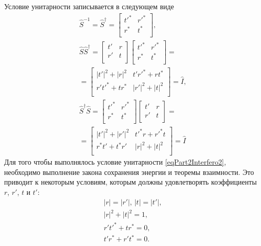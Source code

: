 Условие унитарности записывается в следующем виде
\begin{eqnarray}
\hat{S}^{-1} = 
\hat{S}^{\dag} =
\begin{bmatrix}
t'^\ast & r'^\ast \\
r^\ast & t^\ast \\
\end{bmatrix}, 
\nonumber \\
\hat{S} \hat{S}^{\dag} =
\begin{bmatrix}
t' & r \\
r' & t \\
\end{bmatrix}
\begin{bmatrix}
t'^\ast & r'^\ast \\
r^\ast & t^\ast \\
\end{bmatrix} =
\nonumber \\
=
\begin{bmatrix}
\left|t'\right|^2 + \left|r\right|^2 & t' r'^\ast + r t^\ast \\
r' t'^\ast + t r^\ast & \left|r'\right|^2 + \left|t\right|^2 \\
\end{bmatrix} = 
\hat{I},
\nonumber \\
\hat{S}^{\dag} \hat{S} =
\begin{bmatrix}
t'^\ast & r'^\ast \\
r^\ast & t^\ast \\
\end{bmatrix}
\begin{bmatrix}
t' & r \\
r' & t \\
\end{bmatrix}
 =
\nonumber \\
=
\begin{bmatrix}
\left|t'\right|^2 + \left|r'\right|^2 & t'^\ast r + r'^\ast t \\
r^\ast t' + t^\ast r' & \left|r\right|^2 + \left|t\right|^2 \\
\end{bmatrix} = 
\hat{I}
\label{eqPart2Interfero2}
\end{eqnarray}
Для того чтобы выполнялось условие унитарности
\eqref{eqPart2Interfero2}, необходимо выполнение закона сохранения
энергии и теоремы взаимности. Это приводит к некоторым условиям,
которым должны удовлетворять коэффициенты $r$, $r'$, $t$ и $t'$:
\begin{eqnarray}
\left|r\right| = \left|r'\right|, \, \left|t\right| = \left|t'\right|,
\nonumber \\
\left|r\right|^2 + \left|t\right|^2 = 1, 
\nonumber \\
r' t'^\ast + t r^\ast = 0,
\nonumber \\
t' r^\ast + r' t^\ast = 0.
\label{eqPart2Interfero3}
\end{eqnarray}
